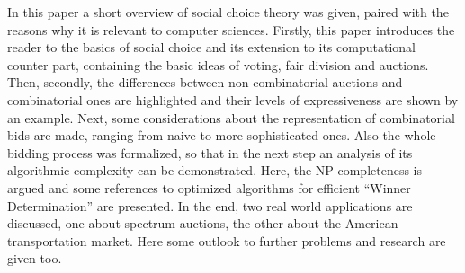 \documentclass[a4paper]{paper}
\begin{document}
In this paper a short overview of social choice theory was given, paired with the reasons why it is relevant to computer sciences.
Firstly, this paper introduces the reader to the basics of social choice and its extension to its computational counter part, containing the basic ideas of voting, fair division and auctions.
Then, secondly, the differences between non-combinatorial auctions and combinatorial ones are highlighted and their levels of expressiveness are shown by an example.
Next, some considerations about the representation of combinatorial bids are made, ranging from naive to more sophisticated ones.
Also the whole bidding process was formalized, so that in the next step an analysis of its algorithmic complexity can be demonstrated.
Here, the NP-completeness is argued and some references to optimized algorithms for efficient ``Winner Determination'' are presented.
In the end, two real world applications are discussed, one about spectrum auctions, the other about the American transportation market. Here some outlook to further problems and research are given too.


\end{document}
